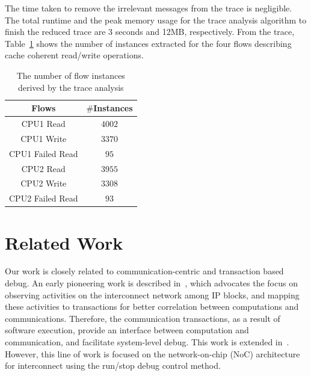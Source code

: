\documentclass[conference]{IEEEtran}
\begin{document}
The time taken to remove the irrelevant messages from the trace is negligible.  The total runtime and the peak memory usage for the trace analysis algorithm to finish the reduced trace are 3 seconds and 12MB, respectively.  From the trace, Table~\ref{table-case-2} shows the number of instances extracted for the four flows describing cache coherent read/write operations. 
\begin{table}[td]
\caption{The number of flow instances derived by the trace analysis}
\begin{center}
\begin{tabular}{|c|c|}
\hline
Flows & $\#$Instances \\
\hline
\hline
CPU1 Read		&  $4002$\\
CPU1 Write	&  $3370$\\
CPU1 Failed Read  &$95$\\
CPU2 Read		&  $3955$\\
CPU2 Write	&  $3308$\\
CPU2 Failed Read  &$93$\\
\hline
\end{tabular}
\end{center}
\label{table-case-2}
\end{table}%



\section{Related Work}

Our work is closely related to communication-centric and transaction based debug.  An early pioneering work is described in~\cite{Goossens2007NOCS}, which advocates the focus on observing activities on the interconnect network among IP blocks, and mapping these activities to transactions for better correlation between computations and communications.  Therefore, the communication transactions, as a result of software execution, provide an interface between computation and communication, and facilitate  system-level debug.  This work is extended in~\cite{Vermeulen2009VLSI-DAT,Goossens2009DATE}.  However, this line of work is focused on the network-on-chip (NoC) architecture for interconnect using the run/stop debug control method.  
\end{document}
